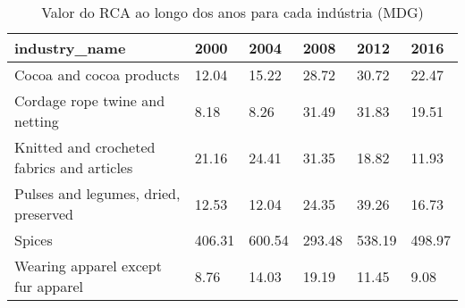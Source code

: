 \begin{table}
\centering
\caption{Valor do RCA ao longo dos anos para cada indústria (MDG)}
\begin{tabular}{p{6cm}p{1.5cm}p{1.5cm}p{1.5cm}p{1.5cm}p{1.5cm}}
\toprule
                             industry\_name &   2000 &   2004 &   2008 &   2012 &   2016 \\
\midrule
                  Cocoa and cocoa products &  12.04 &  15.22 &  28.72 &  30.72 &  22.47 \\
            Cordage rope twine and netting &   8.18 &   8.26 &  31.49 &  31.83 &  19.51 \\
Knitted and crocheted fabrics and articles &  21.16 &  24.41 &  31.35 &  18.82 &  11.93 \\
      Pulses and legumes, dried, preserved &  12.53 &  12.04 &  24.35 &  39.26 &  16.73 \\
                                    Spices & 406.31 & 600.54 & 293.48 & 538.19 & 498.97 \\
        Wearing apparel except fur apparel &   8.76 &  14.03 &  19.19 &  11.45 &   9.08 \\
\bottomrule
\end{tabular}
\end{table}
